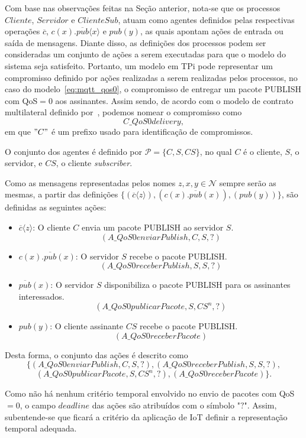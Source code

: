 Com base nas observações feitas na Seção anterior, nota-se que os processos $Cliente$, $Servidor$ e $ClienteSub$, atuam como agentes definidos pelas respectivas operações $\overline{c}$, $c(x).\overline{pub}\langle x \rangle$ e $pub(y)$, as quais apontam ações de entrada ou saída de mensagens. Diante disso, as definições dos processos podem ser consideradas um conjunto de ações a serem executadas para que o modelo do sistema seja satisfeito. Portanto, um modelo em TPi pode representar um compromisso definido por ações realizadas a serem realizadas pelos processos, no caso do modelo~\ref{eq:mqtt_qos0}, o compromisso de entregar um pacote PUBLISH com QoS$=0$  aos assinantes. Assim sendo, de acordo com o modelo de contrato multilateral definido por~\citeauthor{xu2004multi}, podemos nomear o compromisso como $$C\_QoS0delivery,$$ em que $"C"$ é um prefixo usado para identificação de compromissos. 

O conjunto dos agentes é definido por $\mathcal{P} = \{C, S, CS\}$, no qual $C$ é o cliente, $S$, o servidor, e $CS$, o cliente \textit{subscriber}.

Como as mensagens representadas pelos nomes $z, x, y \in \mathcal{N}$ sempre serão as mesmas, a partir das definições $\{(\overline{c}\langle z \rangle), (c(x).\overline{pub}(x)), (pub(y)) \}$, são definidas as seguintes ações:
\begin{itemize}
	\item $ \overline{c}\langle z \rangle $: O cliente $C$ envia um pacote PUBLISH ao servidor $S$. $$(A\_QoS0enviarPublish,C,S,?)$$
	\item  $c(x).\overline{pub}(x)$: O servidor $S$ recebe o pacote PUBLISH. $$(A\_QoS0receberPublish,S,S,?)$$
	\item $ \overline{pub}(x) $: O servidor $S$ disponibiliza o pacote PUBLISH para os assinantes interessados. $$(A\_QoS0publicarPacote,S,CS^{n},?)$$
	\item $pub(y)$: O cliente assinante $CS$ recebe o pacote PUBLISH. $$(A\_QoS0receberPacote)$$
\end{itemize}

Desta forma, o conjunto das ações é descrito como $$\{(A\_QoS0enviarPublish,C,S,?), (A\_QoS0receberPublish,S,S,?),$$ $$(A\_QoS0publicarPacote,S,CS^{n},?), (A\_QoS0receberPacote)\}.$$

Como não há nenhum critério temporal envolvido no envio de pacotes com QoS$=0$, o campo $deadline$ das ações são atribuídos com o símbolo "$?$". Assim, subentende-se que ficará a critério da aplicação de IoT definir a representação temporal adequada.


